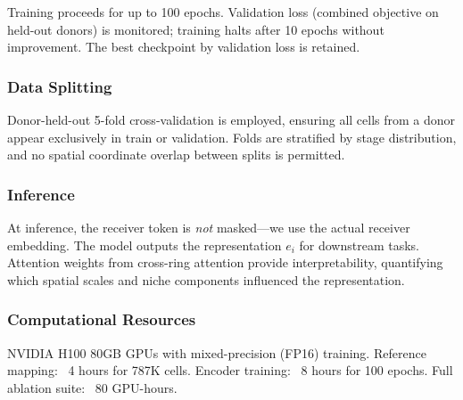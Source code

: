 Training proceeds for up to 100 epochs. Validation loss (combined objective on held-out donors) is monitored; training halts after 10 epochs without improvement. The best checkpoint by validation loss is retained.

\subsubsection{Data Splitting}

Donor-held-out 5-fold cross-validation is employed, ensuring all cells from a donor appear exclusively in train or validation. Folds are stratified by stage distribution, and no spatial coordinate overlap between splits is permitted.

\subsubsection{Inference}

At inference, the receiver token is \textit{not} masked—we use the actual receiver embedding. The model outputs the representation $e_i$ for downstream tasks. Attention weights from cross-ring attention provide interpretability, quantifying which spatial scales and niche components influenced the representation.

\subsubsection{Computational Resources}

NVIDIA H100 80GB GPUs with mixed-precision (FP16) training. Reference mapping: ~4 hours for 787K cells. Encoder training: ~8 hours for 100 epochs. Full ablation suite: ~80 GPU-hours.
